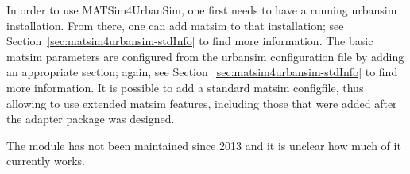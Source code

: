 In order to use MATSim4UrbanSim, one first needs to have a running \acrshort{urbansim} installation.  From there, one can add \gls{matsim} to that installation; see Section~\ref{sec:matsim4urbansim-stdInfo} to find more information.  The basic \gls{matsim} parameters are configured from the \acrshort{urbansim} configuration file by adding an appropriate section; again, see Section~\ref{sec:matsim4urbansim-stdInfo} to find more information.  It is possible to add a standard \gls{matsim} \gls{configfile}, thus allowing to use extended \gls{matsim} features, including those that were added after the adapter package was designed.

The module has not been maintained since 2013 and it is unclear how much of it currently works.





